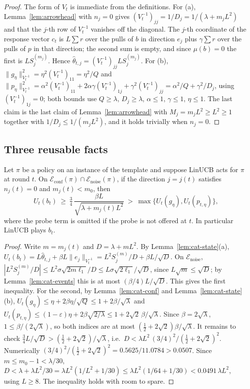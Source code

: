 \documentclass[anon]{alt2027} %
\newcommand{\eps}{\varepsilon}
\begin{document}
\begin{proof}
The form of $V_t$ is immediate from the definitions. For (a), Lemma~\ref{lem:arrowhead}
with $n_j=0$ gives $(V_t^{-1})_{jj}=1/D_j=1/(\lambda+m_jL^2)$ and that the $j$-th
row of $V_t^{-1}$ vanishes off the diagonal. The $j$-th coordinate of the
response vector $c_t$ is $L\sum r$ over the pulls of $b$ in direction $e_j$
plus $\gamma\sum r$ over the pulls of $p$ in that direction; the second sum is
empty, and since $\mu(b)=0$ the first is $LS_j^{(m_j)}$. Hence
$\widehat\theta_{t,j}=(V_t^{-1})_{jj}LS_j^{(m_j)}$. For (b),
$\|g_\eta\|^2_{V_t^{-1}}=\eta^2(V_t^{-1})_{11}=\eta^2/Q$ and
$\|p_\eta\|^2_{V_t^{-1}}=\alpha^2(V_t^{-1})_{11}+2\alpha \gamma(V_t^{-1})_{1j}+\gamma^2(V_t^{-1})_{jj}
=\alpha^2/Q+\gamma^2/D_j$, using $(V_t^{-1})_{1j}=0$; both bounds use $Q\ge\lambda$,
$D_j\ge\lambda$, $\alpha\le1$, $\gamma\le1$, $\eta\le1$. The last claim is the last
claim of Lemma~\ref{lem:arrowhead} with $M_j=m_jL^2\ge L^2\ge1$ together with
$1/D_j\le1/(m_jL^2)$, and it holds trivially when $n_j=0$.
\end{proof}

\subsection{Three reusable facts}

\begin{lemma}
\label{lem:cat-trap}
Let $\pi$ be a policy on an instance of the template and suppose LinUCB acts
for $\pi$ at round $t$. On $\mathcal E_{\mathrm{conf}}(\pi)\cap\mathcal E_{\mathrm{noise}}(\pi)$,
if the direction $j=j(t)$ satisfies $n_j(t)=0$ and $m_j(t)<m_0$, then
\[
U_t(b_t)\ \ge\ \tfrac34\,\frac{\beta L}{\sqrt{\lambda+m_j(t)L^2}}\ >\ \max\{U_t(g_\eta),U_t(p_{t,\eta})\},
\]
where the probe term is omitted if the probe is not offered at $t$. In
particular LinUCB plays $b_t$.
\end{lemma}

\begin{proof}
Write $m=m_j(t)$ and $D=\lambda+mL^2$. By Lemma~\ref{lem:cat-state}(a),
$U_t(b_t)=L\widehat\theta_{t,j}+\beta L\|e_j\|_{V_t^{-1}}=L^2S_j^{(m)}/D+\beta L/\sqrt D$.
On $\mathcal E_{\mathrm{noise}}$, $|L^2S_j^{(m)}/D|\le L^2\sigma\sqrt{2m\ell_1}/D\le L\sigma\sqrt{2\ell_1}/\sqrt D$,
since $L\sqrt m\le\sqrt D$; by Lemma~\ref{lem:cat-events} this is at most
$(\beta/4)L/\sqrt D$. This gives the first inequality. For the second, by
Lemma~\ref{lem:cat-conf} and Lemma~\ref{lem:cat-state}(b),
$U_t(g_\eta)\le\eta+2\beta\eta/\sqrt Q\le1+2\beta/\sqrt\lambda$ and
$U_t(p_{t,\eta})\le(1-\eps)\eta+2\beta\sqrt{2/\lambda}\le1+2\sqrt2\,\beta/\sqrt\lambda$.
Since $\beta=2\sqrt\lambda$, $1\le\beta/(2\sqrt\lambda)$, so both indices are at
most $(\tfrac12+2\sqrt2)\beta/\sqrt\lambda$. It remains to check
$\tfrac34L/\sqrt D>(\tfrac12+2\sqrt2)/\sqrt\lambda$, i.e.\
$D<\lambda L^2\,(3/4)^2/(\tfrac12+2\sqrt2)^2$. Numerically
$(3/4)^2/(\tfrac12+2\sqrt2)^2=0.5625/11.0784>0.0507$. Since $m\le m_0-1<\lambda/30$,
$D<\lambda+\lambda L^2/30=\lambda L^2(1/L^2+1/30)\le\lambda L^2(1/64+1/30)<0.0491\,\lambda L^2$,
using $L\ge8$. The inequality holds with room to spare.
\end{proof}
\end{document}
